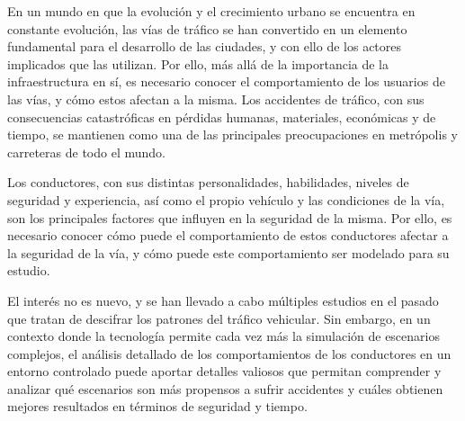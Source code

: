 En un mundo en que la evolución y el crecimiento urbano se encuentra en constante evolución, las vías de tráfico se han convertido
en un elemento fundamental para el desarrollo de las ciudades, y con ello de los actores implicados que las utilizan. Por ello, más allá
de la importancia de la infraestructura en sí, es necesario conocer el comportamiento de los usuarios de las vías, y cómo estos afectan
a la misma. Los accidentes de tráfico, con sus consecuencias catastróficas en pérdidas humanas, materiales, económicas y de tiempo,
se mantienen como una de las principales preocupaciones en metrópolis y carreteras de todo el mundo.

Los conductores, con sus distintas personalidades, habilidades, niveles de seguridad y experiencia, así como el propio vehículo y
las condiciones de la vía, son los principales factores que influyen en la seguridad de la misma. Por ello, es necesario conocer
cómo puede el comportamiento de estos conductores afectar a la seguridad de la vía, y cómo puede este comportamiento ser modelado
para su estudio.

El interés no es nuevo, y se han llevado a cabo múltiples estudios en el pasado que tratan de descifrar los patrones del tráfico vehicular.
Sin embargo, en un contexto donde la tecnología permite cada vez más la simulación de escenarios complejos, el análisis detallado de los comportamientos
de los conductores en un entorno controlado puede aportar detalles valiosos que permitan comprender y analizar qué escenarios son más
propensos a sufrir accidentes y cuáles obtienen mejores resultados en términos de seguridad y tiempo.

\clearpage